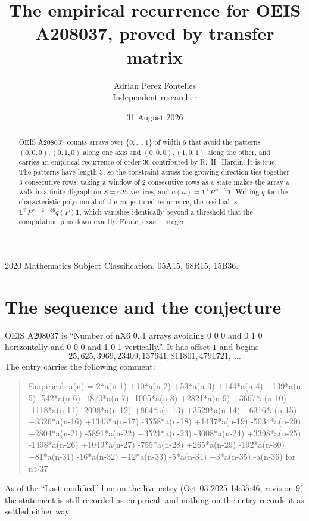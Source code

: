 \documentclass[11pt,a4paper]{article}
\title{The empirical recurrence for OEIS A208037, proved by transfer matrix}
\author{Adrian Perez Fontelles\\ \small Independent researcher}
\date{31 August 2026}
\theoremstyle{plain}
\theoremstyle{definition}
\begin{document}
\maketitle

\begin{abstract}
OEIS A208037 counts arrays over $\{0,\dots,1\}$ of width $6$ that avoid the patterns
$(0,0,0), (0,1,0)$ along one axis and $(0,0,0), (1,0,1)$ along the other, and carries an empirical recurrence of
order $36$ contributed by R.~H.~Hardin. It is true. The patterns have length $3$, so
the constraint across the growing direction ties together $3$ consecutive rows: taking a
window of $2$ consecutive rows as a state makes the array a walk in a finite digraph
on $S=625$ vertices, and $a(n)=\mathbf{1}^{\!\top}P^{\,n-2}\mathbf{1}$. Writing $q$
for the characteristic polynomial of the conjectured recurrence, the residual is
$\mathbf{1}^{\!\top}P^{\,n-2-36}q(P)\mathbf{1}$, which vanishes identically
beyond a threshold that the computation pins down exactly. Finite, exact, integer.
\end{abstract}

\noindent\small 2020 Mathematics Subject Classification. 05A15, 68R15, 15B36.\normalsize

\section{The sequence and the conjecture}

OEIS A208037 is ``Number of nX6 0..1 arrays avoiding 0 0 0 and 0 1 0 horizontally and 0 0 0 and 1 0 1 vertically.''. It has offset
$1$ and begins
\[
25, 625, 3969, 23409, 137641, 811801, 4791721,\ \dots
\]
The entry carries the following comment:
\begin{quote}\small
Empirical: a(n) = 2*a(n-1) +10*a(n-2) +53*a(n-3) +144*a(n-4) +139*a(n-5) -542*a(n-6) -1870*a(n-7) -1005*a(n-8) +2821*a(n-9) +3667*a(n-10) -1118*a(n-11) -2098*a(n-12) +864*a(n-13) +3529*a(n-14) +6316*a(n-15) +3326*a(n-16) +1343*a(n-17) -3558*a(n-18) +1437*a(n-19) -5034*a(n-20) +2804*a(n-21) -5891*a(n-22) +3521*a(n-23) -3008*a(n-24) +3398*a(n-25) -1498*a(n-26) +1049*a(n-27) -755*a(n-28) +265*a(n-29) -192*a(n-30) +81*a(n-31) -16*a(n-32) +12*a(n-33) -5*a(n-34) +3*a(n-35) -a(n-36) for n>37
\end{quote}
As of the ``Last modified'' line on the live entry (Oct 03 2025 14:35:46, revision
9) the statement is still recorded as empirical, and nothing on the entry
records it as settled either way.
\end{document}
